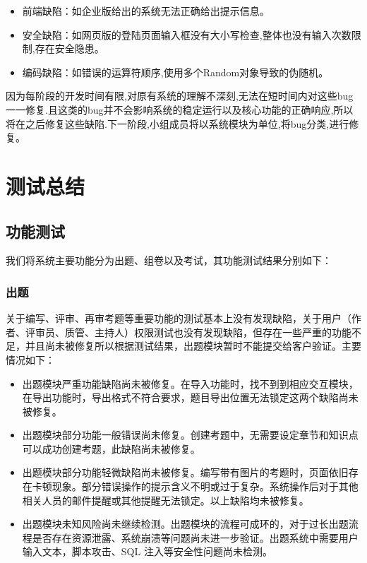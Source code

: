 \documentclass[hyperref, a4paper]{ctexart}
\providecommand{\tightlist}{%
  \setlength{\itemsep}{0pt}\setlength{\parskip}{0pt}}
\begin{document}
\begin{itemize}
\tightlist
\item
  前端缺陷：如企业版给出的系统无法正确给出提示信息。
\item
  安全缺陷：如网页版的登陆页面输入框没有大小写检查,整体也没有输入次数限制,存在安全隐患。
\item
  编码缺陷：如错误的运算符顺序,使用多个Random对象导致的伪随机。
\end{itemize}

因为每阶段的开发时间有限,对原有系统的理解不深刻,无法在短时间内对这些bug一一修复.且这类的bug并不会影响系统的稳定运行以及核心功能的正确响应,所以将在之后修复这些缺陷.下一阶段,小组成员将以系统模块为单位,将bug分类,进行修复。

\hypertarget{ux6d4bux8bd5ux603bux7ed3}{%
\section{测试总结}\label{ux6d4bux8bd5ux603bux7ed3}}

\hypertarget{ux529fux80fdux6d4bux8bd5}{%
\subsection{功能测试}\label{ux529fux80fdux6d4bux8bd5}}

我们将系统主要功能分为出题、组卷以及考试，其功能测试结果分别如下：

\hypertarget{ux51faux9898}{%
\subsubsection{出题}\label{ux51faux9898}}

关于编写、评审、再审考题等重要功能的测试基本上没有发现缺陷，关于用户（作者、评审员、质管、主持人）权限测试也没有发现缺陷，但存在一些严重的功能不足，并且尚未被修复所以根据测试结果，出题模块暂时不能提交给客户验证。主要情况如下：

\begin{itemize}
\tightlist
\item
  出题模块严重功能缺陷尚未被修复。在导入功能时，找不到到相应交互模块，在导出功能时，导出格式不符合要求，题目导出位置无法锁定这两个缺陷尚未被修复。
\item
  出题模块部分功能一般错误尚未修复。创建考题中，无需要设定章节和知识点可以成功创建考题，此缺陷尚未被修复。
\item
  出题模块部分功能轻微缺陷尚未被修复。编写带有图片的考题时，页面依旧存在卡顿现象。部分错误操作的提示含义不明或过于复杂。系统操作后对于其他相关人员的邮件提醒或其他提醒无法锁定。以上缺陷均未被修复。
\item
  出题模块未知风险尚未继续检测。出题模块的流程可成环的，对于过长出题流程是否存在资源泄露、系统崩溃等问题尚未进一步验证。出题系统中需要用户输入文本，脚本攻击、SQL
  注入等安全性问题尚未检测。
\end{itemize}
\end{document}

